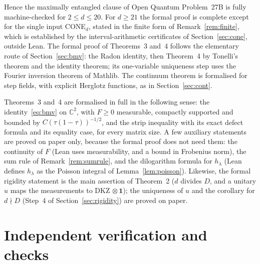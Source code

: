 \documentclass[11pt]{amsart}
\theoremstyle{definition}
\theoremstyle{remark}
\numberwithin{equation}{section}
\newcommand{\C}{\mathbb{C}}
\newcommand{\one}{\mathbf{1}}
\begin{document}
Hence the maximally entangled clause of Open Quantum Problem~27B is fully machine-checked for $2\le d\le20$. For
$d\ge21$ the formal proof is complete except for the single input CONE$_d$, stated in the finite form of
Remark~\ref{rem:finite}, which is established by the interval-arithmetic certificates of Section~\ref{sec:cone},
outside Lean. The formal proof of Theorems~3 and~4 follows the elementary route of Section~\ref{sec:bmv}: the Radon
identity, then Theorem~4 by Tonelli's theorem and the identity theorem; its one-variable uniqueness step uses the
Fourier inversion theorem of Mathlib. The continuum theorem is formalised for step fields, with explicit Herglotz
functions, as in Section~\ref{sec:cont}.

Theorems~3 and~4 are formalised in full in the following sense: the identity~\eqref{eq:bmv} on $\C^2$, with $F\ge0$
measurable, compactly supported and bounded by $C(\tau(1-\tau))^{-1/2}$, and the strip inequality with its exact defect
formula and its equality case, for every matrix size. A few auxiliary statements are proved on paper only, because the
formal proof does not need them: the continuity of $F$ (Lean uses measurability, and a bound in Frobenius norm), the sum
rule of Remark~\ref{rem:sumrule}, and the dilogarithm formula for $h_\lambda$ (Lean defines $h_\lambda$ as the Poisson integral
of Lemma~\ref{lem:poisson}). Likewise, the formal rigidity statement is the main assertion of Theorem~2 ($d$ divides $D$,
and a unitary $u$ maps the measurements to DKZ$\,\otimes\one$); the uniqueness of $u$ and the corollary for $d\nmid D$
(Step~4 of Section~\ref{sec:rigidity}) are proved on paper.

\section{Independent verification and checks}\label{sec:checks}
\end{document}
